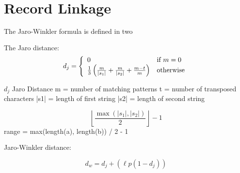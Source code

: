 
\section{Record Linkage}
\label{sec:record-linkage-appendix}

The Jaro-Winkler formula is defined in two 


The Jaro distance:
\begin{equation}
  d_j = \left\{
  \begin{array}{l l}
    0 & \text{if }m = 0 \\ 
    \frac{1}{3}\left(\frac{m}{|s_1|} + \frac{m}{|s_2|} + \frac{m-t}{m}\right) & \text{otherwise} \end{array} \right.
\end{equation}

$ d_j $ Jaro Distance
m = number of matching patterns
t = number of transposed characters
|s1| = length of first string
|s2| = length of second string

\begin{equation}
  \left\lfloor\frac{\max(|s_1|,|s_2|)}{2}\right\rfloor-1
\end{equation}
range = max(length(a), length(b)) / 2 - 1


Jaro-Winkler distance:

\begin{equation}
  d_w = d_j + (\ell p (1 - d_j))
\end{equation}



